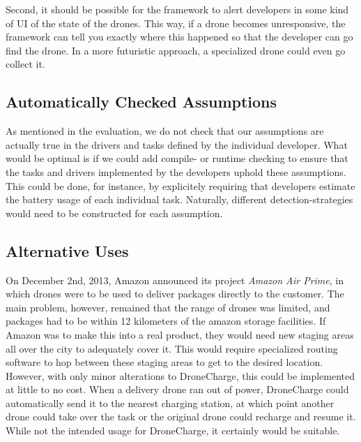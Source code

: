 Second, it should be possible for the framework to alert developers in some kind of UI of the state of the drones. This way, if a drone becomes unresponsive, the framework can tell you exactly where this happened so that the developer can go find the drone. In a more futuristic approach, a specialized drone could even go collect it.

\subsection{Automatically Checked Assumptions}
As mentioned in the evaluation, we do not check that our assumptions are actually true in the drivers and tasks defined by the individual developer. What would be optimal is if we could add compile- or runtime checking to ensure that the tasks and drivers implemented by the developers uphold these assumptions. This could be done, for instance, by explicitely requiring that developers estimate the battery usage of each individual task. Naturally, different detection-strategies would need to be constructed for each assumption.

\subsection{Alternative Uses}
On December 2nd, 2013, Amazon announced its project \textit{Amazon Air Prime}, in which drones were to be used to deliver packages directly to the customer. The main problem, however, remained that the range of drones was limited, and packages had to be within 12 kilometers of the amazon storage facilities. If Amazon was to make this into a real product, they would need new staging areas all over the city to adequately cover it. This would require specialized routing software to hop between these staging areas to get to the desired location. However, with only minor alterations to DroneCharge, this could be implemented at little to no cost. When a delivery drone ran out of power, DroneCharge could automatically send it to the nearest charging station, at which point another drone could take over the task or the original drone could recharge and resume it. While not the intended usage for DroneCharge, it certainly would be suitable.